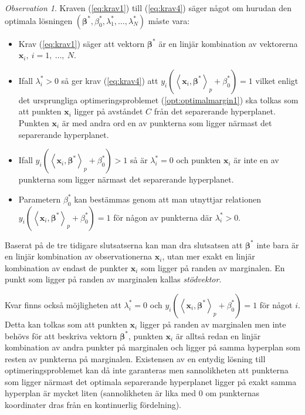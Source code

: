\documentclass[a4paper, 12pt]{report}
\theoremstyle{definition}
\theoremstyle{remark}
\newtheorem*{rem}{Observation}
\newcommand{\bfbeta}{{\boldsymbol{\beta}}}
\newcommand{\bfx}{\mathbf{x}}
\newcommand{\llangle}{\left\langle}
\newcommand{\rrangle}{\right\rangle}
\newcommand{\inner}[2]{\llangle #1, #2 \rrangle}
\begin{document}
\begin{rem}
	Kraven (\ref{eq:krav1}) till (\ref{eq:krav4}) säger något om hurudan den optimala lösningen $\left(\bfbeta^*, \beta^*_0, \lambda_1^*, \dots, \lambda_N^*\right)$ måste vara:
	\begin{itemize}
		\item Krav (\ref{eq:krav1}) säger att vektorn $\bfbeta^*$ är en linjär kombination av vektorerna $\mathbf{x}_i,~i=1,~\dots,~N$.
		\item Ifall $\lambda^*_i > 0$ så ger krav (\ref{eq:krav4}) att $y_i\left(\inner{\bfx_i}{\bfbeta^*}_p+\beta^*_0\right) = 1$ vilket enligt det ursprungliga optimeringsproblemet (\ref{opt:optimalmargin1}) ska tolkas som att punkten $\mathbf{x}_i$ ligger på avståndet $C$ från det separerande hyperplanet. Punkten $\mathbf{x}_i$ är med andra ord en av punkterna som ligger närmast det separerande hyperplanet.
		\item Ifall $y_i\left(\inner{\bfx_i}{\bfbeta^*}_p + \beta^*_0\right) > 1$ så är $\lambda^*_i = 0$ och punkten $\mathbf{x}_i$ är inte en av punkterna som ligger närmast det separerande hyperplanet.
		\item Parametern $\beta^*_0$ kan bestämmas genom att man utnyttjar relationen $y_i\left(\inner{\bfx_i}{\bfbeta^*}_p + \beta^*_0\right) = 1$ för någon av punkterna där $\lambda^*_i > 0$.
	\end{itemize}
	Baserat på de tre tidigare slutsatserna kan man dra slutsatsen att $\bfbeta^*$ inte bara är en linjär kombination av observationerna $\mathbf{x}_i$, utan mer exakt en linjär kombination av endast de punkter $\mathbf{x}_{i}$ som ligger på randen av marginalen. En punkt som ligger på randen av marginalen kallas \emph{stödvektor}.
\end{rem}

Kvar finns också möjligheten att $\lambda^*_i = 0$ och $y_i\left( \inner{\bfx_i}{\bfbeta^*}_p + \beta^*_0\right) = 1$ för något $i$.
Detta kan tolkas som att punkten $\bfx_i$ ligger på randen av marginalen men inte behövs för att beskriva vektorn $\bfbeta^*$, punkten $\bfx_i$ är alltså redan en linjär kombination av andra punkter på marginalen och ligger på samma hyperplan som resten av punkterna på marginalen.
Existensen av en entydig lösning till optimeringsproblemet kan då inte garanteras men sannolikheten att punkterna som ligger närmast det optimala separerande hyperplanet ligger på exakt samma hyperplan är mycket liten (sannolikheten är lika med 0 om punkternas koordinater dras från en kontinuerlig fördelning).
\end{document}
